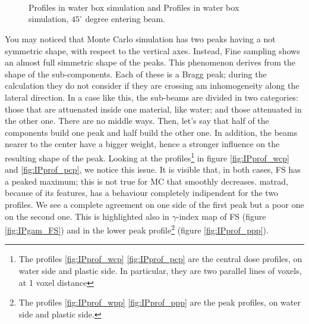 \documentclass[12pt, a4paper, twoside]{book}
\begin{document}
\begin{figure}[]
\centering
{} 
\\
\\
\\
\caption{Profiles in water box simulation and Profiles in water box simulation,  $45^\circ$ degree entering beam.}
\label{fig:IPprof}
\end{figure}

You may noticed that Monte Carlo simulation has two peaks having a not symmetric shape, with respect to the vertical axes. Instead, Fine sampling shows an almost full simmetric shape of the peaks. This phenomenon derives from the shape of the sub-components. Each of these is a Bragg peak; during the calculation they do not consider if they are crossing am inhomogeneity along the lateral direction. In a case like this, the sub-beams are divided in two categories: those that are attuenated inside one material, like water; and those attenuated in the other one. There are no middle ways.
Then, let's say that half of the components build one peak and half build the other one. In addition, the beams nearer to the center have a bigger weight, hence a stronger influence on the resulting shape of the peak.
Looking at the profiles\footnote{The profiles \ref{fig:IPprof_wcp} \ref{fig:IPprof_pcp} are the central dose profiles, on water side and plastic side. In particular, they are two parallel lines of voxels, at 1 voxel distance} in figure \ref{fig:IPprof_wcp} and \ref{fig:IPprof_pcp}, we notice this issue. It is visible that, in both cases, FS has a peaked maximum; this is not true for MC that smoothly decreases. matrad, because of its features, has a behaviour completely indipendent for the two profiles.
We see a complete agreement on one side of the first peak but a poor one on the second one.
This is highlighted also in $\gamma$-index map of FS (figure \ref{fig:IPgam_FS}) and in the lower peak profile\footnote{The profiles \ref{fig:IPprof_wpp} \ref{fig:IPprof_ppp} are the peak profiles, on water side and plastic side.} (figure \ref{fig:IPprof_ppp}).
\end{document}
